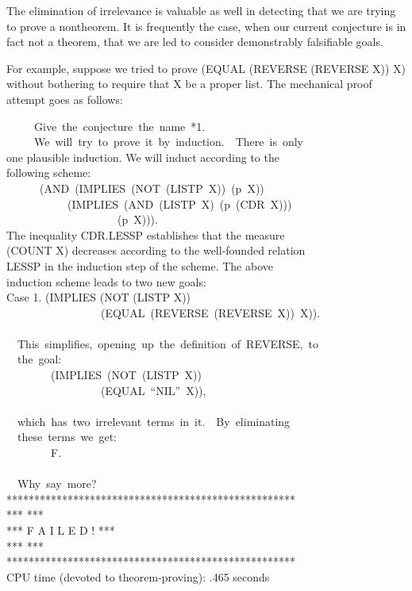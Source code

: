 \documentclass[10pt]{book}
\newenvironment{pubasis}{\begin{flushleft}}{\end{flushleft}}
\begin{document}
The elimination of irrelevance is valuable as well in
detecting that we are trying to prove a nontheorem.
It is frequently the case, when our current conjecture is in fact
not a theorem, that we are led to consider demonstrably falsifiable
goals.

For example, suppose we tried to prove (EQUAL (REVERSE (REVERSE X)) X)
without bothering to require that X be a proper list.
The mechanical proof attempt goes as follows:
\begin{pubasis}
~~~~~Give~the~conjecture~the~name~*1.\\

~~~~~We~will~try~to~prove~it~by~induction.~~There~is~only\\
one plausible induction.  We will induct according to the\\
following scheme:\\
~~~~~~(AND~(IMPLIES~(NOT~(LISTP~X))~(p~X))\\
~~~~~~~~~~~(IMPLIES~(AND~(LISTP~X)~(p~(CDR~X)))\\
~~~~~~~~~~~~~~~~~~~~(p~X))).\\
The inequality CDR.LESSP establishes that the measure\\
(COUNT X) decreases according to the well-founded relation\\
LESSP in the induction step of the scheme.  The above\\
induction scheme leads to two new goals:\\

Case 1.	(IMPLIES (NOT (LISTP X))\\
~~~~~~~~~~~~~~~~~(EQUAL~(REVERSE~(REVERSE~X))~X)).\\
~~\\
~~This~simplifies,~opening~up~the~definition~of~REVERSE,~to\\
~~the~goal:\\

~~~~~~~~(IMPLIES~(NOT~(LISTP~X))\\
~~~~~~~~~~~~~~~~~(EQUAL~``NIL''~X)),\\
~~\\
~~which~has~two~irrelevant~terms~in~it.~~By~eliminating\\
~~these~terms~we~get:\\

~~~~~~~~F.\\
~~\\
~~Why~say~more?\\

****************************************************\\
***                                              ***\\
***            F  A  I  L  E  D !                ***\\
***                                              ***\\
****************************************************\\

CPU time (devoted to theorem-proving):  .465 seconds\\
\end{pubasis}
\end{document}
